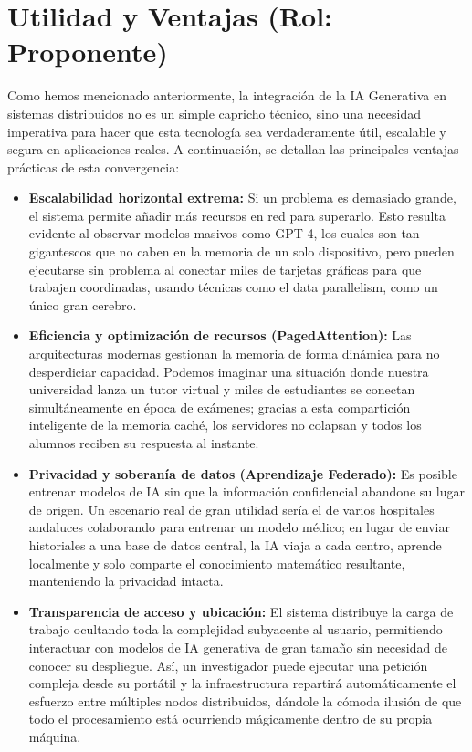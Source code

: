 \documentclass[runningheads]{llncs}
\begin{document}
\section{Utilidad y Ventajas (Rol: Proponente)}
Como hemos mencionado anteriormente, la integración de la IA Generativa en sistemas distribuidos no es un simple capricho técnico, sino una necesidad imperativa para hacer que esta tecnología sea verdaderamente útil, escalable y segura en aplicaciones reales. A continuación, se detallan las principales ventajas prácticas de esta convergencia:

\begin{itemize}
	\item \textbf{Escalabilidad horizontal extrema:} Si un problema es demasiado grande, el sistema permite añadir más recursos en red para superarlo. Esto resulta evidente al observar modelos masivos como GPT-4, los cuales son tan gigantescos que no caben en la memoria de un solo dispositivo, pero pueden ejecutarse sin problema al conectar miles de tarjetas gráficas para que trabajen coordinadas, usando técnicas como el data parallelism, como un único gran cerebro.
	\newline
	\item \textbf{Eficiencia y optimización de recursos (PagedAttention):} Las arquitecturas modernas gestionan la memoria de forma dinámica para no desperdiciar capacidad. Podemos imaginar una situación donde nuestra universidad lanza un tutor virtual y miles de estudiantes se conectan simultáneamente en época de exámenes; gracias a esta compartición inteligente de la memoria caché, los servidores no colapsan y todos los alumnos reciben su respuesta al instante.
	\newline
	\item \textbf{Privacidad y soberanía de datos (Aprendizaje Federado):} Es posible entrenar modelos de IA sin que la información confidencial abandone su lugar de origen. Un escenario real de gran utilidad sería el de varios hospitales andaluces colaborando para entrenar un modelo médico; en lugar de enviar historiales a una base de datos central, la IA viaja a cada centro, aprende localmente y solo comparte el conocimiento matemático resultante, manteniendo la privacidad intacta.
	\newline
	\item \textbf{Transparencia de acceso y ubicación:} El sistema distribuye la carga de trabajo ocultando toda la complejidad subyacente al usuario, permitiendo interactuar con modelos de IA generativa de gran tamaño sin necesidad de conocer su despliegue. Así, un investigador puede ejecutar una petición compleja desde su portátil y la infraestructura repartirá automáticamente el esfuerzo entre múltiples nodos distribuidos, dándole la cómoda ilusión de que todo el procesamiento está ocurriendo mágicamente dentro de su propia máquina.

\end{itemize}
\end{document}
